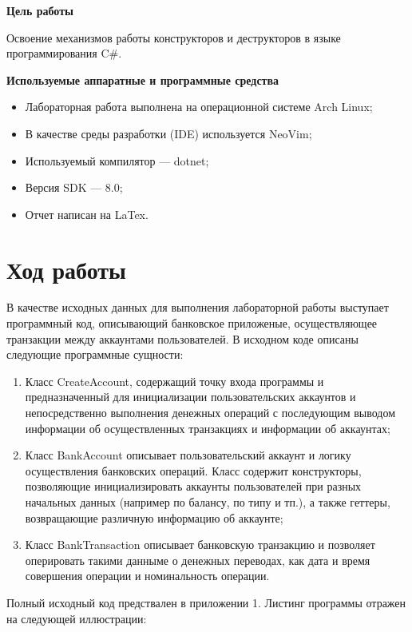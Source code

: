 {\bfseries Цель работы} 

Освоение механизмов работы конструкторов и деструкторов в языке программирования C\#.

{\bfseries Используемые аппаратные и программные средства}
\begin{itemize}
    \item Лабораторная работа выполнена на операционной системе Arch Linux;
    \item В качестве среды разработки (IDE) используется NeoVim;
    \item Используемый компилятор --- dotnet;
    \item Версия SDK --- 8.0;
    \item Отчет написан на LaTex.
\end{itemize}


\chapter{Ход работы}
    
В качестве исходных данных для выполнения лабораторной работы выступает программный код, описывающий банковское приложеные, осуществляющее транзакции между аккаунтами пользователей. В исходном коде описаны следующие программные сущности:

\begin{enumerate}
    \item Класс CreateAccount, содержащий точку входа программы и предназначенный для инициализации пользовательских аккаунтов и непосредственно выполнения денежных операций с последующим выводом информации об осуществленных транзакциях и информации об аккаунтах;
    \item Класс BankAccount описывает пользовательский аккаунт и логику осуществления банковских операций. Класс содержит конструкторы, позволяющие инициализировать аккаунты пользователей при разных начальных данных (например по балансу, по типу и тп.), а также геттеры, возвращающие различную информацию об аккаунте;
    \item Класс BankTransaction описывает банковскую транзакцию и позволяет оперировать такими данныме о денежных переводах, как дата и время совершения операции и номинальность операции.
\end{enumerate}


\newpage

Полный исходный код предствален в приложении 1. 
Листинг программы отражен на следующей иллюстрации:

